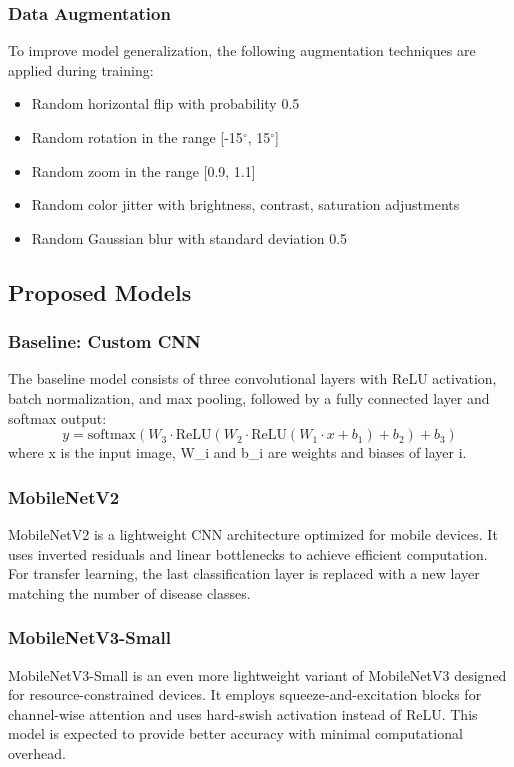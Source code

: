 \documentclass[conference]{IEEEtran}
\begin{document}
\subsubsection{Data Augmentation}
To improve model generalization, the following augmentation techniques are applied during training:
\begin{itemize}
\item Random horizontal flip with probability 0.5
\item Random rotation in the range [-15$^\circ$, 15$^\circ$]
\item Random zoom in the range [0.9, 1.1]
\item Random color jitter with brightness, contrast, saturation adjustments
\item Random Gaussian blur with standard deviation 0.5
\end{itemize}

\subsection{Proposed Models}
\subsubsection{Baseline: Custom CNN}
The baseline model consists of three convolutional layers with ReLU activation, batch normalization, and max pooling, followed by a fully connected layer and softmax output:
\begin{equation}
y = \text{softmax}(W_3 \cdot \text{ReLU}(W_2 \cdot \text{ReLU}(W_1 \cdot x + b_1) + b_2) + b_3)
\end{equation}
where x is the input image, W_i and b_i are weights and biases of layer i.

\subsubsection{MobileNetV2}
MobileNetV2 \cite{sandler2018} is a lightweight CNN architecture optimized for mobile devices. It uses inverted residuals and linear bottlenecks to achieve efficient computation. For transfer learning, the last classification layer is replaced with a new layer matching the number of disease classes.

\subsubsection{MobileNetV3-Small}
MobileNetV3-Small \cite{howard2019} is an even more lightweight variant of MobileNetV3 designed for resource-constrained devices. It employs squeeze-and-excitation blocks for channel-wise attention and uses hard-swish activation instead of ReLU. This model is expected to provide better accuracy with minimal computational overhead.
\end{document}
